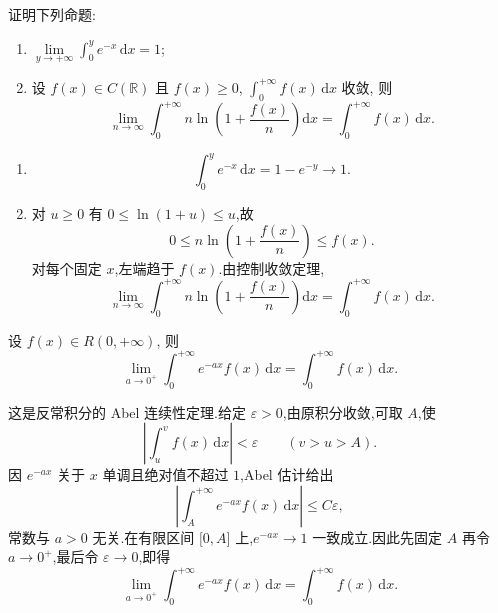 \begin{example}
    证明下列命题:
    \begin{enumerate}
        \item $\displaystyle \lim\limits_{y\to+\infty}\int_0^y e^{-x}\,\mathrm{d}x=1$;
        \item 设 $f(x)\in C(\mathbb{R})$ 且 $f(x)\geq0$, $\displaystyle\int_0^{+\infty}f(x)\,\mathrm{d}x$ 收敛, 则
              \[
                  \displaystyle\lim\limits_{n\to\infty}\int_0^{+\infty}n\ln\left(1+\dfrac{f(x)}{n}\right)\mathrm{d}x
                  =\int_0^{+\infty}f(x)\,\mathrm{d}x.
              \]
    \end{enumerate}
\end{example}
\exampleblank

\begin{solution}
    \leavevmode
    \begin{enumerate}
        \item
              \[
                  \displaystyle\int_0^y e^{-x}\,\mathrm{d}x=1-e^{-y}\longrightarrow1.
              \]
        \item 对 $u\geq0$ 有 $0\leq\ln(1+u)\leq u$,故
              \[
                  0\leq n\ln\left(1+\dfrac{f(x)}{n}\right)\leq f(x).
              \]
              对每个固定 $x$,左端趋于 $f(x)$.由控制收敛定理,
              \[
                  \displaystyle\lim\limits_{n\to\infty}\int_0^{+\infty}n\ln\left(1+\dfrac{f(x)}{n}\right)\mathrm{d}x
                  =\int_0^{+\infty}f(x)\,\mathrm{d}x.
              \]
    \end{enumerate}
\end{solution}

\begin{example}
    设 $f(x)\in R(0,+\infty)$, 则
    \[
        \displaystyle\lim\limits_{a\to0^+}\int_0^{+\infty}e^{-ax}f(x)\,\mathrm{d}x
        =\int_0^{+\infty}f(x)\,\mathrm{d}x.
    \]
\end{example}
\exampleblank

\begin{solution}
    这是反常积分的 Abel 连续性定理.给定 $\varepsilon>0$,由原积分收敛,可取 $A$,使
    \[
        \left|\int_u^v f(x)\,\mathrm{d}x\right|<\varepsilon
        \qquad(v>u>A).
    \]
    因 $e^{-ax}$ 关于 $x$ 单调且绝对值不超过 $1$,Abel 估计给出
    \[
        \left|\int_A^{+\infty}e^{-ax}f(x)\,\mathrm{d}x\right|\leq C\varepsilon,
    \]
    常数与 $a>0$ 无关.在有限区间 $\lbrack0,A\rbrack$ 上,$e^{-ax}\to1$ 一致成立.因此先固定 $A$ 再令 $a\to0^+$,最后令 $\varepsilon\to0$,即得
    \[
        \displaystyle\lim\limits_{a\to0^+}\int_0^{+\infty}e^{-ax}f(x)\,\mathrm{d}x
        =\int_0^{+\infty}f(x)\,\mathrm{d}x.
    \]
\end{solution}

